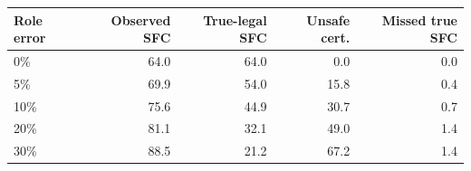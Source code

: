 \begin{tabular}{lrrrr}
\toprule
Role error & Observed SFC & True-legal SFC & Unsafe cert. & Missed true SFC \\
\midrule
0\% & 64.0 & 64.0 & 0.0 & 0.0 \\
5\% & 69.9 & 54.0 & 15.8 & 0.4 \\
10\% & 75.6 & 44.9 & 30.7 & 0.7 \\
20\% & 81.1 & 32.1 & 49.0 & 1.4 \\
30\% & 88.5 & 21.2 & 67.2 & 1.4 \\
\bottomrule
\end{tabular}
